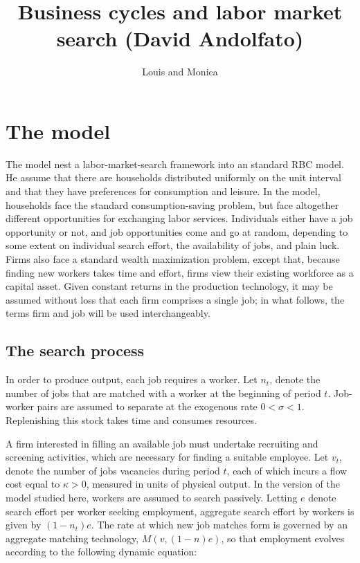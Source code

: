 \documentclass[english]{article}
\begin{document}
\title{Business cycles and labor market search (David Andolfato)}


\author{Louis and Monica}

\maketitle

\section{The model}

The model nest a labor-market-search framework into an standard RBC
model. He assume that there are households distributed uniformly on
the unit interval and that they have preferences for consumption and
leisure. In the model, households face the standard consumption-saving
problem, but face altogether different opportunities for exchanging
labor services. Individuals either have a job opportunity or not,
and job opportunities come and go at random, depending to some extent
on individual search effort, the availability of jobs, and plain luck.
Firms also face a standard wealth maximization problem, except that,
because finding new workers takes time and effort, firms view their
existing workforce as a capital asset. Given constant returns in the
production technology, it may be assumed without loss that each firm
comprises a single job; in what follows, the terms firm and job will
be used interchangeably.


\subsection{The search process}

In order to produce output, each job requires a worker. Let $n_{t}$,
denote the number of jobs that are matched with a worker at the beginning
of period $t$. Job-worker pairs are assumed to separate at the exogenous
rate $0<\sigma<1$. Replenishing this stock takes time and consumes
resources. 

A firm interested in filling an available job must undertake recruiting
and screening activities, which are necessary for finding a suitable
employee. Let $v_{t}$, denote the number of jobs vacancies during
period $t$, each of which incurs a flow cost equal to $\kappa>0$,
measured in units of physical output. In the version of the model
studied here, workers are assumed to search passively. Letting $e$
denote search effort per worker seeking employment, aggregate search
effort by workers is given by $(1-n_{t})e$. The rate at which new
job matches form is governed by an aggregate matching technology,
$M(v,(1-n)e)$, so that employment evolves according to the following
dynamic equation: 
\end{document}
